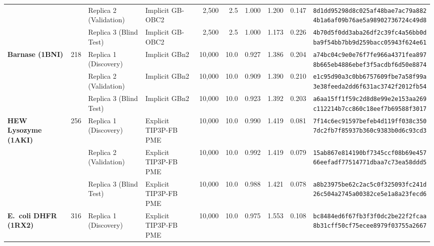 \documentclass[10pt,letterpaper]{article}
\begin{document}
{\begin{longtable}{@{}l c l l r r c c c l@{}}
 &  & Replica 2 (Validation) & Implicit GB-OBC2 & 2,500 & 2.5 & 1.000 & 1.200 & 0.147 & \shortstack[l]{\texttt{8d1dd95298d8c025af48bae7ac79a882}\\\texttt{4b1a6af09b76ae5a98902736724c49d8}} \\

 &  & Replica 3 (Blind Test) & Implicit GB-OBC2 & 2,500 & 2.5 & 1.000 & 1.173 & 0.226 & \shortstack[l]{\texttt{4b70d5f0dd3aba26df2c39fc4a56bb0d}\\\texttt{ba9f54bb7bb9d259bacc05943f624e61}} \\
\midrule[0.35pt]
\textbf{Barnase (1BNI)} & 218 & Replica 1 (Discovery) & Implicit GBn2 & 10,000 & 10.0 & 0.927 & 1.386 & 0.204 & \shortstack[l]{\texttt{a74bc04c9e0e76f7fe966a4371fea897}\\\texttt{8b665eb4886ebef3f5acdbf6d50e8874}} \\

 &  & Replica 2 (Validation) & Implicit GBn2 & 10,000 & 10.0 & 0.909 & 1.390 & 0.210 & \shortstack[l]{\texttt{e1c95d90a3c0bb6757609fbe7a58f99a}\\\texttt{3e38feeda2dd6f631ac3742f2012fb54}} \\

 &  & Replica 3 (Blind Test) & Implicit GBn2 & 10,000 & 10.0 & 0.923 & 1.392 & 0.203 & \shortstack[l]{\texttt{a6aa15ff1f59c2d8d8e99e2e153aa269}\\\texttt{c112214b7cc860c18eef7b69588f3017}} \\
\midrule[0.35pt]
\textbf{HEW Lysozyme (1AKI)} & 256 & Replica 1 (Discovery) & Explicit TIP3P-FB PME & 10,000 & 10.0 & 0.990 & 1.419 & 0.081 & \shortstack[l]{\texttt{7f14c6ec91597befeb4d119ff038c350}\\\texttt{7dc2fb7f85937b360c9383b0d6c93cd3}} \\

 &  & Replica 2 (Validation) & Explicit TIP3P-FB PME & 10,000 & 10.0 & 0.992 & 1.419 & 0.079 & \shortstack[l]{\texttt{15ab867e814190bf7345ccf08b69e457}\\\texttt{66eefadf77514771dbaa7c73ea58ddd5}} \\

 &  & Replica 3 (Blind Test) & Explicit TIP3P-FB PME & 10,000 & 10.0 & 0.988 & 1.421 & 0.078 & \shortstack[l]{\texttt{a8b23975be62c2ac5c0f325093fc241d}\\\texttt{26c504a2745a00382ce5e1a8a23fecd6}} \\
\midrule[0.35pt]
\textbf{E.\ coli DHFR (1RX2)} & 316 & Replica 1 (Discovery) & Explicit TIP3P-FB PME & 10,000 & 10.0 & 0.975 & 1.553 & 0.108 & \shortstack[l]{\texttt{bc8484ed6f67fb3f3f0dc2be22f2fcaa}\\\texttt{8b31cff50cf75ecee8979f03755a2667}} \\


\end{longtable}}
\end{document}
